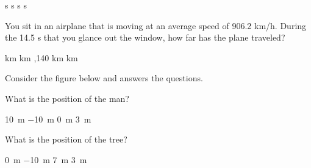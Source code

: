 \documentclass[answers]{exam}
\begin{document}
\begin{questions}
\begin{questions}
\begin{choices}
 s
 s
 s
 s
\end{choices}



\question %
You sit in an airplane that is moving at an average speed of 906.2 km/h. During the 14.5 s that you glance out the window, how far has the plane traveled?

\begin{choices}
 km
 km
,140 km
 km
\end{choices}



\begin{EnvUplevel}
    Consider the figure below and answers the questions.
\end{EnvUplevel}


\begin{figure}[h!]
    \centering
\end{figure}

\question
What is the position of the man?

\begin{choices}
    \choice \SI{10}{m}
    \choice \SI{-10}{m}
    \choice \SI{0}{m}
    \choice \SI{3}{m}
\end{choices}

\question
What is the position of the tree?

\begin{choices}
    \choice \SI{0}{m}
    \choice \SI{-10}{m}
    \choice \SI{7}{m}
    \choice \SI{3}{m}
\end{choices}


\end{questions}
\end{questions}
\end{document}
